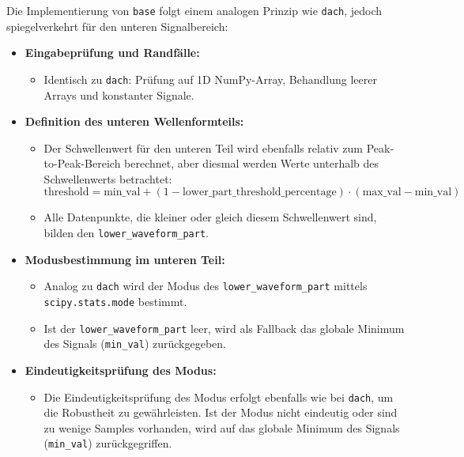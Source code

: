\documentclass[a4paper, portrait, 12pt]{scrartcl} %
\begin{document}
Die Implementierung von \texttt{base} folgt einem analogen Prinzip wie \texttt{dach}, jedoch spiegelverkehrt für den unteren Signalbereich:
\begin{itemize}
    \item \textbf{Eingabeprüfung und Randfälle:}
    \begin{itemize}
        \item Identisch zu \texttt{dach}: Prüfung auf 1D NumPy-Array, Behandlung leerer Arrays und konstanter Signale.
    \end{itemize}

    \item \textbf{Definition des unteren Wellenformteils:}
    \begin{itemize}
        \item Der Schwellenwert für den unteren Teil wird ebenfalls relativ zum Peak-to-Peak-Bereich berechnet, aber diesmal werden Werte unterhalb des Schwellenwerts betrachtet:
        $$
        \text{threshold} = \text{min\_val} + (1 - \text{lower\_part\_threshold\_percentage}) \cdot (\text{max\_val} - \text{min\_val})
        $$
        
        \item Alle Datenpunkte, die kleiner oder gleich diesem Schwellenwert sind, bilden den \texttt{lower\_waveform\_part}.
    \end{itemize}

    \item \textbf{Modusbestimmung im unteren Teil:}
    \begin{itemize}
        \item Analog zu \texttt{dach} wird der Modus des \texttt{lower\_waveform\_part} mittels \texttt{scipy.stats.mode} bestimmt.
        \item Ist der \texttt{lower\_waveform\_part} leer, wird als Fallback das globale Minimum des Signals (\texttt{min\_val}) zurückgegeben.
    \end{itemize}

    \item \textbf{Eindeutigkeitsprüfung des Modus:}
    \begin{itemize}
        \item Die Eindeutigkeitsprüfung des Modus erfolgt ebenfalls wie bei \texttt{dach}, um die Robustheit zu gewährleisten. Ist der Modus nicht eindeutig oder sind zu wenige Samples vorhanden, wird auf das globale Minimum des Signals (\texttt{min\_val}) zurückgegriffen.
    \end{itemize}
\end{itemize}
\end{document}
